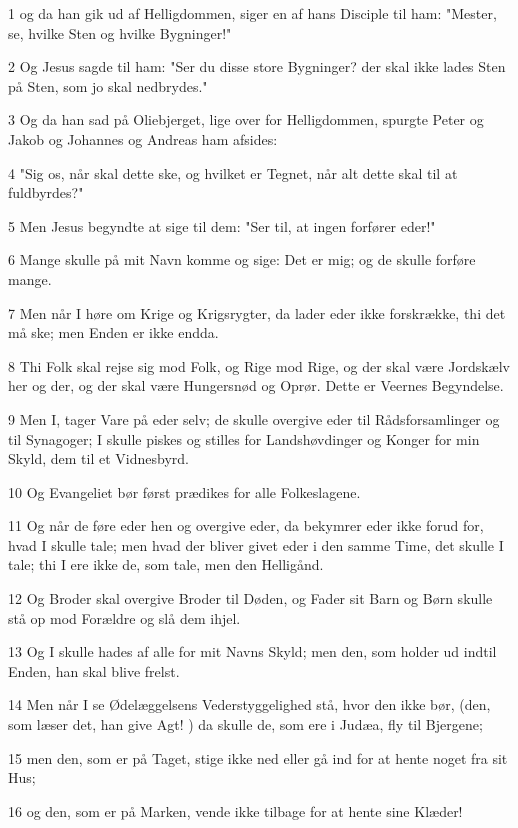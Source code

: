 \par 1 og da han gik ud af Helligdommen, siger en af hans Disciple til ham: "Mester, se, hvilke Sten og hvilke Bygninger!"
\par 2 Og Jesus sagde til ham: "Ser du disse store Bygninger? der skal ikke lades Sten på Sten, som jo skal nedbrydes."
\par 3 Og da han sad på Oliebjerget, lige over for Helligdommen, spurgte Peter og Jakob og Johannes og Andreas ham afsides:
\par 4 "Sig os, når skal dette ske, og hvilket er Tegnet, når alt dette skal til at fuldbyrdes?"
\par 5 Men Jesus begyndte at sige til dem: "Ser til, at ingen forfører eder!"
\par 6 Mange skulle på mit Navn komme og sige: Det er mig; og de skulle forføre mange.
\par 7 Men når I høre om Krige og Krigsrygter, da lader eder ikke forskrække, thi det må ske; men Enden er ikke endda.
\par 8 Thi Folk skal rejse sig mod Folk, og Rige mod Rige, og der skal være Jordskælv her og der, og der skal være Hungersnød og Oprør. Dette er Veernes Begyndelse.
\par 9 Men I, tager Vare på eder selv; de skulle overgive eder til Rådsforsamlinger og til Synagoger; I skulle piskes og stilles for Landshøvdinger og Konger for min Skyld, dem til et Vidnesbyrd.
\par 10 Og Evangeliet bør først prædikes for alle Folkeslagene.
\par 11 Og når de føre eder hen og overgive eder, da bekymrer eder ikke forud for, hvad I skulle tale; men hvad der bliver givet eder i den samme Time, det skulle I tale; thi I ere ikke de, som tale, men den Helligånd.
\par 12 Og Broder skal overgive Broder til Døden, og Fader sit Barn og Børn skulle stå op mod Forældre og slå dem ihjel.
\par 13 Og I skulle hades af alle for mit Navns Skyld; men den, som holder ud indtil Enden, han skal blive frelst.
\par 14 Men når I se Ødelæggelsens Vederstyggelighed stå, hvor den ikke bør, (den, som læser det, han give Agt! ) da skulle de, som ere i Judæa, fly til Bjergene;
\par 15 men den, som er på Taget, stige ikke ned eller gå ind for at hente noget fra sit Hus;
\par 16 og den, som er på Marken, vende ikke tilbage for at hente sine Klæder!
